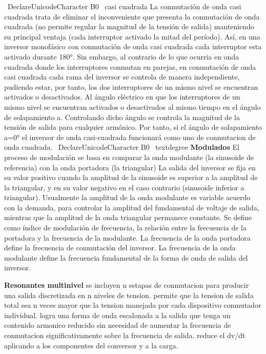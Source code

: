 \documentclass[10pt,letterpaper]{article}
\begin{document}
\ DeclareUnicodeCharacter {B0} {\ casi cuadrada} 
La conmutación de onda casi cuadrada trata de eliminar el inconveniente que presenta la conmutación de onda cuadrada (no permite regular la magnitud de la tensión de salida) manteniendo su principal ventaja (cada interruptor activado la mitad del período).  Así, en una inversor monofásico con conmutación de onda casi cuadrada cada interruptor esta activado  durante 180°. Sin embargo, al contrario de lo que ocurria en onda cuadrada donde los interruptores conmutan en parejas, en conmutación de onda casi cuadrada cada rama del inversor  se controla de manera independiente, pudiendo estar, por tanto, los dos interruptores de un mismo nivel se encuentran activados o desactivados.  Al ángulo eléctrico en que los interruptores de un mismo nivel se encuentran activados o desactivados al mismo tiempo en el ángulo de solapamiento a.  Controlando dicho ángulo se controla la magnitud de la tensión de salida para cualquier armónico.  Por tanto, si el ángulo de solapamiento a=0° el inversor de onda casi-cuadrada funcionará como uno de conmutacion de onda cuadrada.
\ DeclareUnicodeCharacter {B0} {\ textdegree}
\textbf{Modulados}
El proceso de modulación se basa en comparar la onda modulante (la sinusoide de referencia) con la onda portadora (la triangular) La salida del inversor se fija en su valor positivo cuando la amplitud de la sinusoide es superior a la amplitud de la triangular,  y en su valor negativo en el caso contrario (sinusoide inferior a triangular).
Usualmente la amplitud de la onda modulante es variable acuerdo con la demanda, para controlar la amplitud del fundamental de voltaje de salida, mientras que la amplitud de la onda triangular permanece constante.
Se define como índice de modulación de frecuencia, la relación entre la  frecuencia de la portadora y la frecuencia de la modulante. La frecuencia de la onda portadora define la frecuencia de conmutación del inversor. La frecuencia de la onda modulante define la frecuencia fundamental de la forma de  onda de salida del inversor.

\textbf{Resonantes multinivel}
se incluyen n estapas de conmutacion para producir una salida discretizada en n niveles  de tension. 
permite que la tension de salida total sea n veces mayor que la tension manejada por cada dispositivo conmutador individual.
logra una forma de onda escalonada a la salida que tenga un contenido armonico reducido sin necesidad de aumentar la frecuencia de conmutacion significativamente sobre la frecuencia de salida. reduce el dv/dt aplicando a los componentes del conversor y a la carga.
\end{document}
